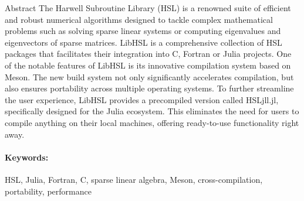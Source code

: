 \documentclass[gdweb]{geradwp}
\renewcommand{\_}{\raisebox{+0.35mm}{\textunderscore}}
\newcommand{\LibHSL}{LibHSL\xspace}
\newcommand{\HSLjll}{HSL\_jll.jl\xspace}
\begin{document}
\GDpageCouverture

\begin{GDpagetitre}

\begin{GDauthlist}
\end{GDauthlist}

\begin{GDaffillist}
\end{GDaffillist}

\begin{GDemaillist}
\end{GDemaillist}

\end{GDpagetitre}


\GDabstracts

\begin{GDabstract}{Abstract}
The Harwell Subroutine Library (HSL) is a renowned suite of efficient and robust numerical algorithms designed to tackle complex mathematical problems such as solving sparse linear systems or computing eigenvalues and eigenvectors of sparse matrices.
\LibHSL is a comprehensive collection of HSL packages that facilitates their integration into C, Fortran or Julia projects.
One of the notable features of \LibHSL is its innovative compilation system based on Meson.
The new build system not only significantly accelerates compilation, but also ensures portability across multiple operating systems.
To further streamline the user experience, \LibHSL provides a precompiled version called \HSLjll, specifically designed for the Julia ecosystem.
This eliminates the need for users to compile anything on their local machines, offering ready-to-use functionality right away.

\paragraph{Keywords: }
HSL, Julia, Fortran, C, sparse linear algebra, Meson, cross-compilation, portability, performance
\end{GDabstract}
\end{document}
